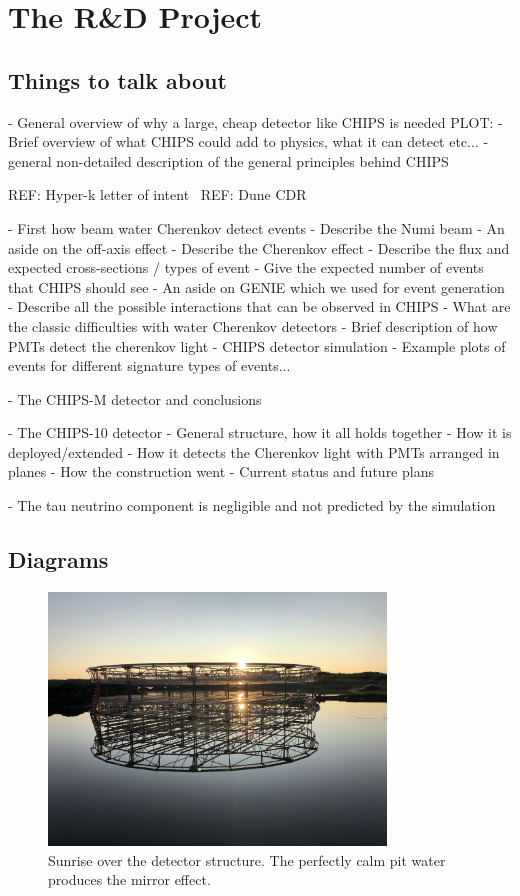 \chapter{The \chips R\&D Project}
\label{chap:chips}

\section{Things to talk about}

- General overview of why a large, cheap detector like CHIPS is needed
PLOT:
- Brief overview of what CHIPS could add to physics, what it can detect etc...
- general non-detailed description of the general principles behind CHIPS

REF: Hyper-k letter of intent~\cite{abe2011}
REF: Dune CDR~\cite{acciarri2016}

- First how beam water Cherenkov detect events
- Describe the Numi beam
- An aside on the off-axis effect
- Describe the Cherenkov effect
- Describe the flux and expected cross-sections / types of event
- Give the expected number of events that CHIPS should see
- An aside on GENIE which we used for event generation
- Describe all the possible interactions that can be observed in CHIPS
- What are the classic difficulties with water Cherenkov detectors
- Brief description of how PMTs detect the cherenkov light
- CHIPS detector simulation
- Example plots of events for different signature types of events...

- The CHIPS-M detector and conclusions

- The CHIPS-10 detector
- General structure, how it all holds together
- How it is deployed/extended
- How it detects the Cherenkov light with PMTs arranged in planes
- How the construction went
- Current status and future plans

- The tau neutrino component is negligible and not predicted by the simulation

\section{Diagrams}

\begin{figure}
    \includegraphics[width=0.8\textwidth]{diagrams/4-chips/sunrise.jpeg}
    \caption[Sunrise over the \chips detector.]
    {Sunrise over the \chips detector structure. The perfectly calm pit water
        produces the mirror effect.}
    \label{fig:sunrise}
\end{figure}

